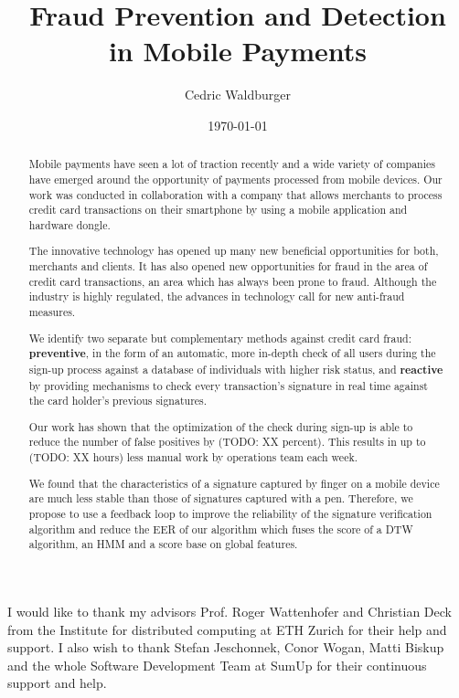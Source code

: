 \documentclass[a4paper, oneside]{csthesis}
\title{Fraud Prevention and Detection\\[5pt] in Mobile Payments}
\author{Cedric Waldburger}
\institute{Distributed Computing Group \\[2pt]
Computer Engineering and Networks Laboratory \\[2pt]
ETH Zurich}
\date{\today}
\begin{document}
\frontmatter
\maketitle %

\cleardoublepage

\begin{acknowledgements}

  I would like to thank my advisors Prof. Roger Wattenhofer and Christian Deck from the Institute for distributed computing at ETH Zurich for their help and support. I also wish to thank Stefan Jeschonnek, Conor Wogan, Matti Biskup and the whole Software Development Team at SumUp for their continuous support and help.

\end{acknowledgements}


\begin{abstract}
    Mobile payments have seen a lot of traction recently and a wide variety of companies have emerged around the opportunity of payments processed from mobile devices. Our work was conducted in collaboration with a company that allows merchants to process credit card transactions on their smartphone by using a mobile application and hardware dongle.

    The innovative technology has opened up many new beneficial opportunities for both, merchants and clients. It has also opened new opportunities for fraud in the area of credit card transactions, an area which has always been prone to fraud. Although the industry is highly regulated, the advances in technology call for new anti-fraud measures.

    We identify two  separate but complementary methods against credit card fraud: \textbf{preventive}, in the form of an automatic, more in-depth check of all users during the sign-up process against a database of individuals with higher risk status, and \textbf{reactive} by providing mechanisms to check every transaction's signature in real time against the card holder's previous signatures.

    Our work has shown that the optimization of the check during sign-up is able to reduce the number of false positives by (TODO: XX percent). This results in up to (TODO: XX hours) less manual work by operations team each week.

    We found that the characteristics of a signature captured by finger on a mobile device are much less stable than those of signatures captured with a pen. Therefore, we propose to use a feedback loop to improve the reliability of the signature verification algorithm and reduce the EER of our algorithm which fuses the score of a DTW algorithm, an HMM and a score base on global features.

\end{abstract}
\end{document}
